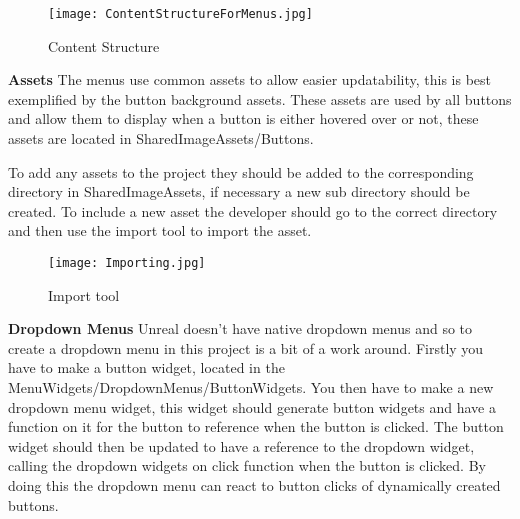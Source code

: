 \documentclass[../main.tex]{subfiles}
\begin{document}
\begin{figure}
\texttt{[image: ContentStructureForMenus.jpg]}
\caption{Content Structure}
\end{figure}

\break
\textbf{Assets}
\break
The menus use common assets to allow easier updatability, this is best exemplified by the button background assets. These assets are used by all buttons and allow them to display when a button is either hovered over or not, these assets are located in SharedImageAssets/Buttons.

To add any assets to the project they should be added to the corresponding directory in SharedImageAssets, if necessary a new sub directory should be created. To include a new asset the developer should go to the correct directory and then use the import tool to import the asset.

\begin{figure}
\texttt{[image: Importing.jpg]}
\caption{Import tool}
\end{figure}

\break
\textbf{Dropdown Menus}
Unreal doesn't have native dropdown menus and so to create a dropdown menu in this project is a bit of a work around. Firstly you have to make a button widget, located in the MenuWidgets/DropdownMenus/ButtonWidgets. You then have to make a new dropdown menu widget, this widget should generate button widgets and have a function on it for the button to reference when the button is clicked. The button widget should then be updated to have a reference to the dropdown widget, calling the dropdown widgets on click function when the button is clicked. By doing this the dropdown menu can react to button clicks of dynamically created buttons.
\end{document}
